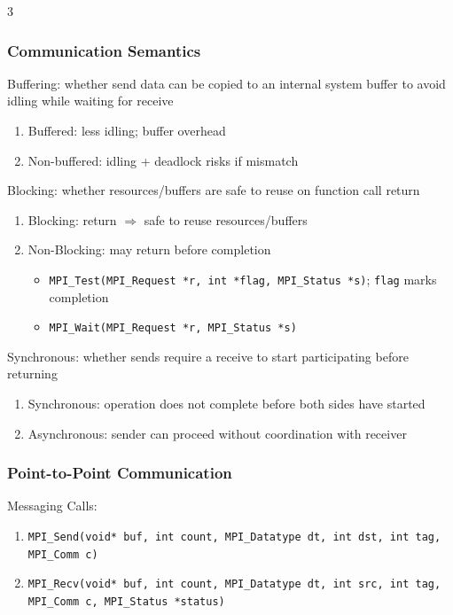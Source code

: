 \documentclass[12pt, a4paper]{article}
\begin{document}
\begin{multicols*}{3}
\subsubsection{Communication Semantics}
Buffering: whether send data can be copied to an internal system buffer to avoid idling while waiting for receive
\begin{enumerate}[\roman*.]
  \item Buffered: less idling; buffer overhead
  \item Non-buffered: idling + deadlock risks if mismatch
\end{enumerate}

Blocking: whether resources/buffers are safe to reuse on function call return
\begin{enumerate}[\roman*.]
  \item Blocking: return $\Rightarrow$ safe to reuse resources/buffers
  \item Non-Blocking: may return before completion
    \begin{itemize}[leftmargin=*]\vspace{3pt}
      \item \lstinline|MPI_Test(MPI_Request *r, int *flag, MPI_Status *s)|; \lstinline|flag| marks completion
      \item \lstinline|MPI_Wait(MPI_Request *r, MPI_Status *s)|
    \end{itemize}
\end{enumerate}

Synchronous: whether sends require a receive to start participating before returning
\begin{enumerate}[\roman*.]
  \item Synchronous: operation does not complete before both sides have started
  \item Asynchronous: sender can proceed without coordination with receiver
\end{enumerate}

\colbreak

\subsubsection{Point-to-Point Communication}

Messaging Calls:
\begin{enumerate}[\roman*.]
  \item \lstinline|MPI_Send(void* buf, int count, MPI_Datatype dt, int dst, int tag, MPI_Comm c)| 
  \item \lstinline|MPI_Recv(void* buf, int count, MPI_Datatype dt, int src, int tag, MPI_Comm c, MPI_Status *status)|
\end{enumerate}


\end{multicols*}
\end{document}
